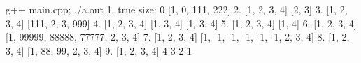 \begin{console} g++ main.cpp; ./a.out
1.
true
size: 0
[1, 0, 111, 222]
2.
[1, 2, 3, 4]
[2, 3]
3.
[1, 2, 3, 4]
[111, 2, 3, 999]
4.
[1, 2, 3, 4]
[1, 3, 4]
[1, 3, 4]
5.
[1, 2, 3, 4]
[1, 4]
6.
[1, 2, 3, 4]
[1, 99999, 88888, 77777, 2, 3, 4]
7.
[1, 2, 3, 4]
[1, -1, -1, -1, -1, -1, 2, 3, 4]
8.
[1, 2, 3, 4]
[1, 88, 99, 2, 3, 4]
9.
[1, 2, 3, 4]
4 3 2 1
\end{console}


